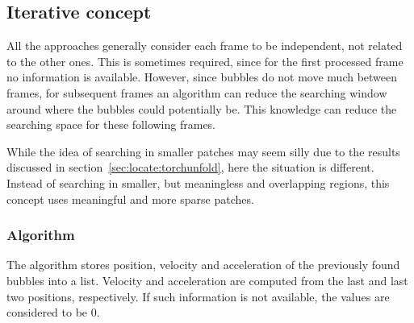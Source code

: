 \subsection{Iterative concept}

All the approaches generally consider each frame to be independent, not related to the other ones.
This is sometimes required, since for the first processed frame no information is available.
However, since bubbles do not move much between frames, for subsequent frames an algorithm can reduce the searching window around where the bubbles could potentially be.
This knowledge can reduce the searching space for these following frames.

While the idea of searching in smaller patches may seem silly due to the results discussed in section~\ref{sec:locate:torchunfold}, here the situation is different.
Instead of searching in smaller, but meaningless and overlapping regions, this concept uses meaningful and more sparse patches.

\subsubsection{Algorithm}

The algorithm stores position, velocity and acceleration of the previously found bubbles into a list.
Velocity and acceleration are computed from the last and last two positions, respectively.
If such information is not available, the values are considered to be 0.

